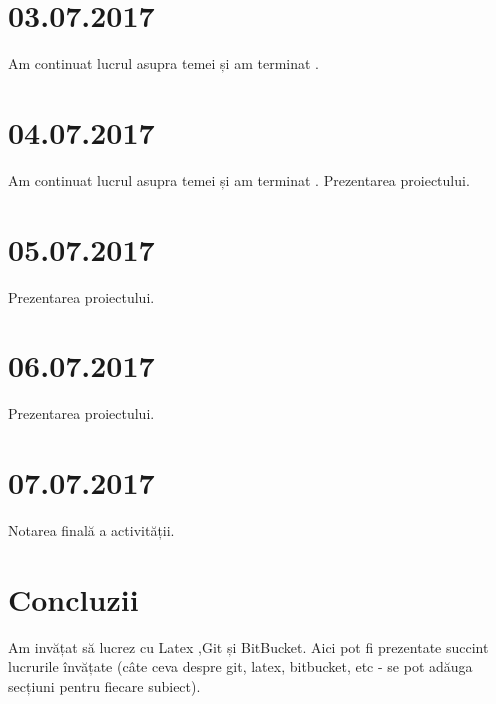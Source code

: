\documentclass{report}
\begin{document}
\chapter{03.07.2017}
Am continuat lucrul asupra temei și am terminat .
\chapter{04.07.2017}
Am continuat lucrul asupra temei și am terminat .
Prezentarea proiectului.
\chapter{05.07.2017}
Prezentarea proiectului.
\chapter{06.07.2017}
Prezentarea proiectului.
\chapter{07.07.2017}

Notarea finală a activității.

\chapter{Concluzii}
Am invățat să lucrez cu Latex ,Git și BitBucket. Aici pot fi prezentate succint lucrurile învățate (câte ceva despre git, latex, bitbucket, etc - se pot adăuga secțiuni pentru fiecare subiect). 
\end{document}
